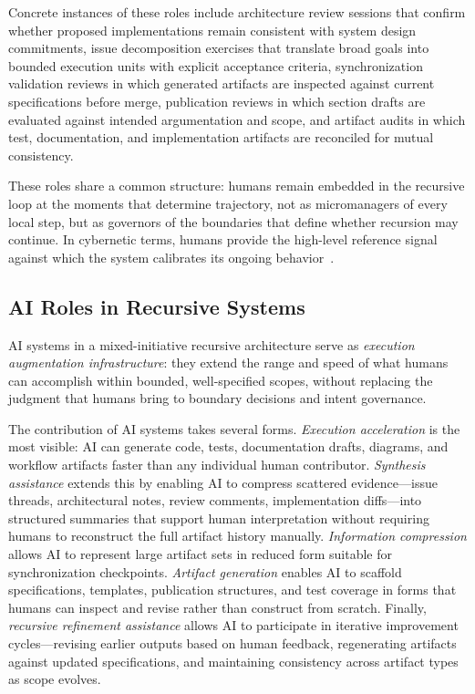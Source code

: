 Concrete instances of these roles include architecture review sessions that confirm whether proposed implementations remain consistent with system design commitments, issue decomposition exercises that translate broad goals into bounded execution units with explicit acceptance criteria, synchronization validation reviews in which generated artifacts are inspected against current specifications before merge, publication reviews in which section drafts are evaluated against intended argumentation and scope, and artifact audits in which test, documentation, and implementation artifacts are reconciled for mutual consistency.

These roles share a common structure: humans remain embedded in the recursive loop at the moments that determine trajectory, not as micromanagers of every local step, but as governors of the boundaries that define whether recursion may continue. In cybernetic terms, humans provide the high-level reference signal against which the system calibrates its ongoing behavior~\cite{Wiener1948Cybernetics,Beer1972BrainFirm}.

\subsection{AI Roles in Recursive Systems}

AI systems in a mixed-initiative recursive architecture serve as \textit{execution augmentation infrastructure}: they extend the range and speed of what humans can accomplish within bounded, well-specified scopes, without replacing the judgment that humans bring to boundary decisions and intent governance.

The contribution of AI systems takes several forms. \textit{Execution acceleration} is the most visible: AI can generate code, tests, documentation drafts, diagrams, and workflow artifacts faster than any individual human contributor. \textit{Synthesis assistance} extends this by enabling AI to compress scattered evidence---issue threads, architectural notes, review comments, implementation diffs---into structured summaries that support human interpretation without requiring humans to reconstruct the full artifact history manually. \textit{Information compression} allows AI to represent large artifact sets in reduced form suitable for synchronization checkpoints. \textit{Artifact generation} enables AI to scaffold specifications, templates, publication structures, and test coverage in forms that humans can inspect and revise rather than construct from scratch. Finally, \textit{recursive refinement assistance} allows AI to participate in iterative improvement cycles---revising earlier outputs based on human feedback, regenerating artifacts against updated specifications, and maintaining consistency across artifact types as scope evolves.

